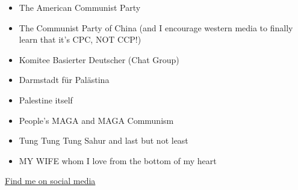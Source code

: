 \documentclass{article}
\begin{document}
\begin{itemize}
\item The American Communist Party
\item The Communist Party of China (and I encourage western media to finally learn that it's CPC, NOT CCP!)
\item Komitee Basierter Deutscher (Chat Group)
\item Darmstadt für Palästina
\item Palestine itself
\item People's MAGA and MAGA Communism
\item Tung Tung Tung Sahur and last but not least
\item MY WIFE whom I love from the bottom of my heart
\end{itemize}

\href{https://x.com/comradeKangaroo}{Find me on social media}

\pagebreak

\printbibliography
\end{document}
